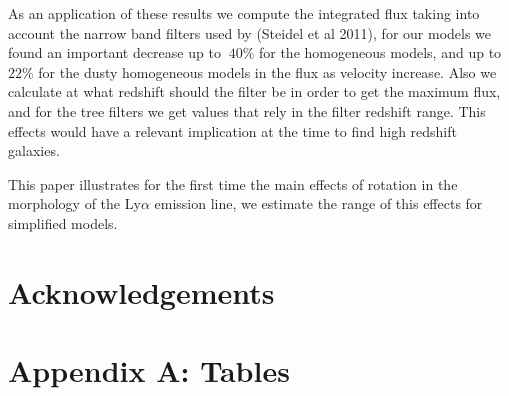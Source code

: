 \documentclass[usenatbib]{mn2e}
\begin{document}
As an application of these results we compute the integrated flux
taking into account the narrow band filters used by (Steidel et al
2011), for our models we found an important decrease up to $~40\%$ for
the homogeneous models, and up to $22\%$ for the dusty homogeneous
models in the flux as velocity increase.  Also we calculate at what
redshift should the filter be in order to get the maximum  flux, and
for the tree filters we get values that rely in the filter redshift
range. This effects would have a relevant implication at the time to
find high redshift galaxies.

This paper illustrates for the first time the main effects of rotation
in the morphology of the Ly$\alpha$ emission line, we estimate the
range of this effects for simplified models.


\section*{Acknowledgements}


 

\section*{Appendix A: Tables}
\end{document}
